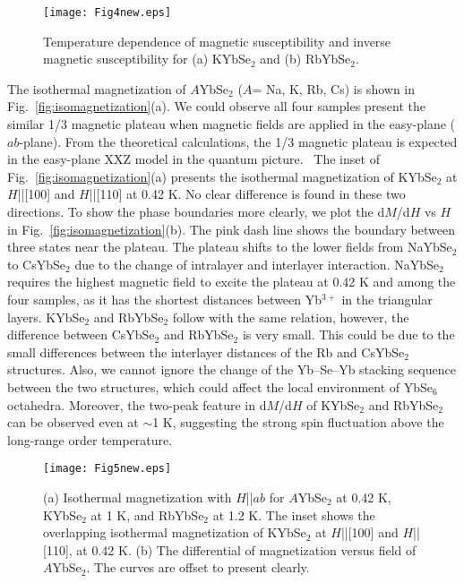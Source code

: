 \documentclass[%
 aip,
 amsmath,amssymb,
 reprint,%
]{revtex4-1}
\begin{document}
\begin{figure}[tbh]
\texttt{[image: Fig4new.eps]}
\caption {\label{fig:he3magne}Temperature dependence of magnetic susceptibility and inverse magnetic susceptibility for (a) KYbSe$_2$ and (b) RbYbSe$_2$.}
\label{crystal}
\end{figure}
The isothermal magnetization of $A$YbSe$_2$ ($A$= Na, K, Rb, Cs) is shown in Fig.~\ref{fig:isomagnetization}(a). We could observe all four samples present the similar 1/3 magnetic plateau when magnetic fields are applied in the easy-plane ($ab$-plane). From the theoretical calculations, the 1/3 magnetic plateau is expected in the easy-plane XXZ model in the quantum picture.~\cite{yamamoto2014quantum} The inset of Fig.~\ref{fig:isomagnetization}(a) presents the isothermal magnetization of KYbSe$_2$ at $H$||[100] and $H$||[110] at 0.42 K. No clear difference is found in these two directions. To show the phase boundaries more clearly, we plot the d$M$/d$H$ vs $H$ in Fig.~\ref{fig:isomagnetization}(b). The pink dash line shows the boundary between three states near the plateau. The plateau shifts to the lower fields from NaYbSe$_2$ to CsYbSe$_2$ due to the change of intralayer and interlayer interaction. NaYbSe$_2$ requires the highest magnetic field to excite the plateau at 0.42 K and among the four samples, as it has the shortest distances between Yb$^{3+}$ in the triangular layers. KYbSe$_2$ and RbYbSe$_2$ follow with the same relation, however, the difference between CsYbSe$_2$ and RbYbSe$_2$ is very small. This could be due to the small differences between the interlayer distances of the Rb and CsYbSe$_2$ structures. Also, we cannot ignore the change of the Yb–Se–Yb stacking sequence between the two structures, which could affect the local environment of YbSe$_6$ octahedra. Moreover, the two-peak feature in d$M$/d$H$ of KYbSe$_2$ and RbYbSe$_2$ can be observed even at $\sim$1 K, suggesting the strong spin fluctuation above the long-range order temperature.


\begin{figure}[tbh]
\texttt{[image: Fig5new.eps]}
\caption {\label{fig:isomagnetization}(a) Isothermal magnetization with $H$||$ab$ for $A$YbSe$_2$ at 0.42 K, KYbSe$_2$ at 1 K, and RbYbSe$_2$ at 1.2 K. The inset shows the overlapping isothermal magnetization of KYbSe$_2$ at $H$||[100] and $H$||[110], at 0.42 K. (b) The differential of magnetization versus field of $A$YbSe$_2$. The curves are offset to present clearly.}
\label{crystal}
\end{figure}
\end{document}

